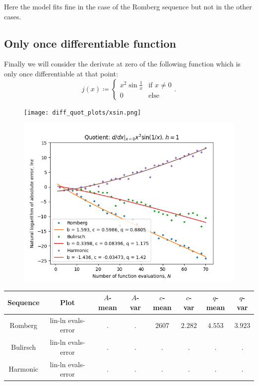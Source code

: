 Here the model fits fine in the case of the Romberg sequence but not in the other cases.

\subsection{Only once differentiable function}

Finally we will consider the derivate at zero of the following function which is only once differentiable at that point:
\[
j(x)\coloneqq \begin{cases}
x^2\sin\frac{1}{x} & \text{if } x \neq 0\\
0 & \text{else}
\end{cases}.
\]

\begin{figure}[H]
\centering
\begin{minipage}{0.45\textwidth}
\centering
\texttt{[image: diff\_quot\_plots/xsin.png]}
\end{minipage}
\begin{minipage}{0.45\textwidth}
\centering
\includegraphics[scale=0.45]{diff_quot_plots/xsin_hp_trend.png}
\end{minipage}
\end{figure}

\begin{table}[H]
    \centering
    \small
    \small
    \begin{tabular}{c|c||c|c|c|c|c|c}
Sequence & Plot & \(A\)-mean & \(A\)-var & \(c\)-mean & \(c\)-var & \(q\)-mean & \(q\)-var\\\hline
Romberg & lin-ln evals-error & . & . & \(2607\) & \(2.282\) & \(4.553\) & \(3.923\) \\
Bulirsch & lin-ln evals-error & . & . & . & . & . & . \\
Harmonic & lin-ln evals-error & . & . & . & . & . & . \\
    \end{tabular}
    \label{tab:my_label}
\end{table}

